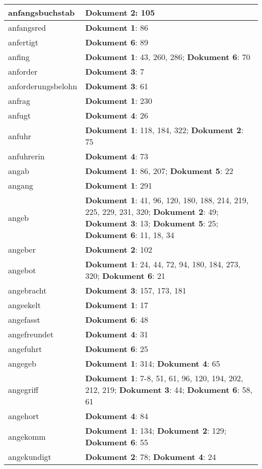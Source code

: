 \documentclass[a5paper]{article}
\begin{document}
\begin{longtable}[l]{|l|p{3in}|}
\hline
anfangsbuchstab & \textbf{Dokument 2}: 105 \\
\hline
anfangsred & \textbf{Dokument 1}: 86 \\
\hline
anfertigt & \textbf{Dokument 6}: 89 \\
\hline
anfing & \textbf{Dokument 1}: 43, 260, 286; \textbf{Dokument 6}: 70 \\
\hline
anforder & \textbf{Dokument 3}: 7 \\
\hline
anforderungsbelohn & \textbf{Dokument 3}: 61 \\
\hline
anfrag & \textbf{Dokument 1}: 230 \\
\hline
anfugt & \textbf{Dokument 4}: 26 \\
\hline
anfuhr & \textbf{Dokument 1}: 118, 184, 322; \textbf{Dokument 2}: 75 \\
\hline
anfuhrerin & \textbf{Dokument 4}: 73 \\
\hline
angab & \textbf{Dokument 1}: 86, 207; \textbf{Dokument 5}: 22 \\
\hline
angang & \textbf{Dokument 1}: 291 \\
\hline
angeb & \textbf{Dokument 1}: 41, 96, 120, 180, 188, 214, 219, 225, 229, 231, 320; \textbf{Dokument 2}: 49; \textbf{Dokument 3}: 13; \textbf{Dokument 5}: 25; \textbf{Dokument 6}: 11, 18, 34 \\
\hline
angeber & \textbf{Dokument 2}: 102 \\
\hline
angebot & \textbf{Dokument 1}: 24, 44, 72, 94, 180, 184, 273, 320; \textbf{Dokument 6}: 21 \\
\hline
angebracht & \textbf{Dokument 3}: 157, 173, 181 \\
\hline
angeekelt & \textbf{Dokument 1}: 17 \\
\hline
angefasst & \textbf{Dokument 6}: 48 \\
\hline
angefreundet & \textbf{Dokument 4}: 31 \\
\hline
angefuhrt & \textbf{Dokument 6}: 25 \\
\hline
angegeb & \textbf{Dokument 1}: 314; \textbf{Dokument 4}: 65 \\
\hline
angegriff & \textbf{Dokument 1}: 7-8, 51, 61, 96, 120, 194, 202, 212, 219; \textbf{Dokument 3}: 44; \textbf{Dokument 6}: 58, 61 \\
\hline
angehort & \textbf{Dokument 4}: 84 \\
\hline
angekomm & \textbf{Dokument 1}: 134; \textbf{Dokument 2}: 129; \textbf{Dokument 6}: 55 \\
\hline
angekundigt & \textbf{Dokument 2}: 78; \textbf{Dokument 4}: 24 \\

\end{longtable}
\end{document}
